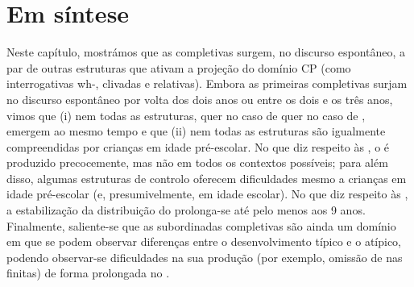 \documentclass[output=paper]{LSP/langsci}
\begin{document}
\section{Em síntese}
\label{sec:santoscompletivas_sintese}

Neste capítulo, mostrámos que as completivas surgem, no discurso espontâneo, a par de outras estruturas que ativam a projeção do domínio CP (como interrogativas wh-, clivadas e relativas). Embora as primeiras completivas surjam no discurso espontâneo por volta dos dois anos ou entre os dois e os três anos, vimos que (i) nem todas as estruturas, quer no caso de  quer no caso de , emergem ao mesmo tempo e que (ii) nem todas as estruturas são igualmente compreendidas por crianças em idade pré-escolar. No que diz respeito às , o  é produzido precocemente, mas não em todos os contextos possíveis; para além disso, algumas estruturas de controlo oferecem dificuldades mesmo a crianças em idade pré-escolar (e, presumivelmente, em idade escolar). No que diz respeito às , a estabilização da distribuição do  prolonga-se até pelo menos aos 9 anos. Finalmente, saliente-se que as subordinadas completivas são ainda um domínio em que se podem observar diferenças entre o desenvolvimento típico e o atípico, podendo observar-se dificuldades na sua produção (por exemplo, omissão de  nas finitas) de forma prolongada no . 

{\sloppy
\printbibliography[heading=subbibliography,notkeyword=this]
}
\end{document}
